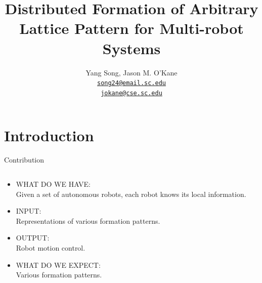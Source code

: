 \documentclass[10pt]{beamer}
\title{Distributed Formation of Arbitrary Lattice Pattern for
  Multi-robot Systems}
\author{
  Yang Song, Jason M. O'Kane\\
  \href{mailto:song24@email.sc.edu}{{\tt song24@email.sc.edu} \\
  \href{mailto:jokane@cse.sc.edu}{\tt jokane@cse.sc.edu}}
}
\institute[
  Dept.\ of Computer Science and Engineering\\
  University of South Carolina
] %
{%
  Dept. of Computer Science and Engineering\\
  University of South Carolina
  
}
\begin{document}
\begin{frame}[plain] %
  \titlepage
\end{frame}

\section{Introduction}
\begin{frame}{Contribution}{}
\begin{block}{}
  \begin{columns}[T] %
    \begin{column}{.58\textwidth}
      \begin{itemize}
      \item {\textcolor{scred}{\large WHAT DO WE HAVE:}}\\
        Given a set of autonomous robots, each robot knows its local information.
      \item {\textcolor{scred}{\large INPUT:}}\\
        Representations of various formation patterns.
      \item {\textcolor{scred}{\large OUTPUT:}}\\
        Robot motion control.
      \item {\textcolor{scred}{\large WHAT DO WE EXPECT:}}\\
        Various formation patterns.
      \end{itemize}
    \end{column}%
    \begin{column}{.4\textwidth}
    \end{column}%
  \end{columns}
  
\end{block}
\end{frame}

\end{document}
